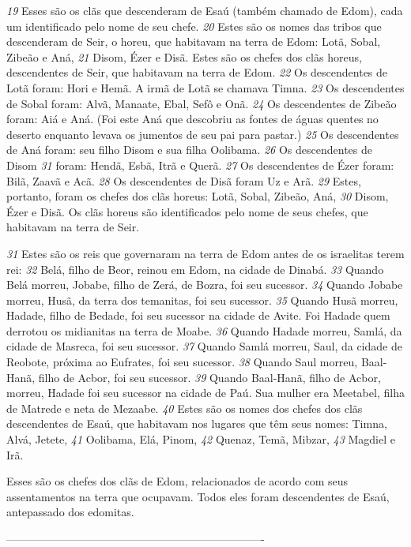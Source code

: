 \bigskip   
\textit{\tiny 19}
Esses são os clãs que descenderam de Esaú (também chamado de Edom), cada
um identificado pelo nome de seu chefe.
\textit{\tiny 20}
Estes são os nomes das tribos que descenderam de Seir, o horeu, que habitavam
na terra de Edom: Lotã, Sobal, Zibeão e Aná, 
\textit{\tiny 21}
Disom, Ézer e Disã. Estes são os
chefes dos clãs horeus, descendentes de Seir, que habitavam na terra de Edom.
\textit{\tiny 22}
Os  descendentes de Lotã foram: Hori e Hemã. A irmã de Lotã se chamava
 Timna.
\textit{\tiny 23}
Os descendentes de Sobal foram: Alvã, Manaate, Ebal, Sefô e Onã.
\textit{\tiny 24}
Os descendentes de Zibeão foram: Aiá e Aná. (Foi este Aná que descobriu as
 fontes de águas quentes no deserto enquanto levava os jumentos de seu pai para
 pastar.)
\textit{\tiny 25}
Os descendentes de Aná foram: seu filho Disom e sua filha Oolibama.
\textit{\tiny 26}
Os descendentes de Disom
\textit{\tiny 31}
 foram: Hendã, Esbã, Itrã e Querã.
\textit{\tiny 27}
Os descendentes de Ézer foram: Bilã, Zaavã e Acã.
\textit{\tiny 28}
Os descendentes de Disã foram Uz e Arã.
\textit{\tiny 29}
Estes, portanto, foram os chefes dos clãs horeus: Lotã, Sobal, Zibeão, Aná,
\textit{\tiny 30}
Disom, Ézer e Disã. Os clãs horeus são identificados pelo nome de seus chefes,
que habitavam na terra de Seir.



\bigskip   
\textit{\tiny 31}
Estes    são os reis que governaram na terra de Edom antes de os israelitas terem
rei:
\textit{\tiny 32}
Belá, filho de Beor, reinou em Edom, na cidade de Dinabá.
\textit{\tiny 33}
Quando Belá morreu, Jobabe, filho de Zerá, de Bozra, foi seu sucessor.
\textit{\tiny 34}
Quando Jobabe morreu, Husã, da terra dos temanitas, foi seu sucessor.
\textit{\tiny 35}
Quando    Husã morreu, Hadade, filho de Bedade, foi seu sucessor na cidade de
 Avite. Foi Hadade quem derrotou os midianitas na terra de Moabe.
\textit{\tiny 36}
Quando Hadade morreu, Samlá, da cidade de Masreca, foi seu sucessor.
\textit{\tiny 37}
Quando Samlá morreu, Saul, da cidade de Reobote, próxima ao Eufrates,
 foi
 seu sucessor.
\textit{\tiny 38}
Quando Saul morreu, Baal-Hanã, filho de Acbor, foi seu sucessor.
\textit{\tiny 39}
Quando Baal-Hanã, filho de Acbor, morreu, Hadade
 foi seu sucessor na
 cidade de Paú. Sua mulher era Meetabel, filha de Matrede e neta de Mezaabe.
\textit{\tiny 40}
Estes  são os nomes dos chefes dos clãs descendentes de Esaú, que habitavam
nos lugares que têm seus nomes: Timna, Alvá, Jetete, 
\textit{\tiny 41}
Oolibama, Elá, Pinom,
\textit{\tiny 42}
Quenaz, Temã, Mibzar, 
\textit{\tiny 43}
Magdiel e Irã. 

\medskip   
Esses são os chefes dos clãs de Edom,
relacionados de acordo com seus assentamentos na terra que ocupavam. Todos
eles foram descendentes de Esaú, antepassado dos edomitas.

----------------------------------------------------------------------
